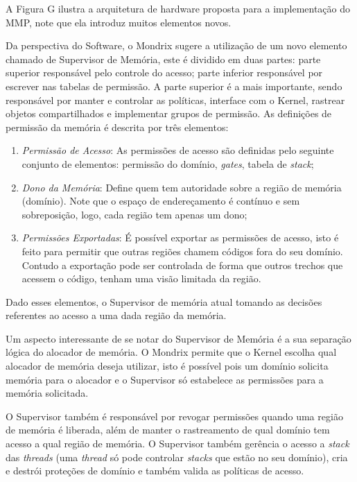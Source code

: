 
A Figura G ilustra a arquitetura de hardware proposta para a implementação do
MMP, note que ela introduz muitos elementos novos. %

Da perspectiva do Software, o Mondrix \citep{mondrix} sugere a utilização de um
novo elemento chamado de Supervisor de Memória, este é dividido em duas partes:
parte superior responsável pelo controle do acesso; parte inferior responsável
por escrever nas tabelas de permissão. A parte superior é a mais importante,
sendo responsável por manter e controlar as políticas, interface com o Kernel,
rastrear objetos compartilhados e implementar grupos de permissão. As
definições de permissão da memória é descrita por três elementos:

\begin{enumerate}
	\item \emph{Permissão de Acesso}: As permissões de acesso são definidas pelo
				seguinte conjunto de elementos: permissão do domínio, \emph{gates},
        tabela de \emph{stack};
	\item \emph{Dono da Memória}: Define quem tem autoridade sobre a região de
				memória (domínio). Note que o espaço de endereçamento é contínuo e sem
				sobreposição, logo, cada região tem apenas um dono;
	\item \emph{Permissões Exportadas}: É possível exportar as permissões de
				acesso, isto é feito para permitir que outras regiões chamem códigos
				fora do seu domínio. Contudo a exportação pode ser controlada de forma
				que outros trechos que acessem o código, tenham uma visão limitada da
				região.
\end{enumerate}

Dado esses elementos, o Supervisor de memória atual tomando as decisões
referentes ao acesso a uma dada região da memória.

Um aspecto interessante de se notar do Supervisor de Memória é a sua separação
lógica do alocador de memória. O Mondrix permite que o Kernel escolha qual
alocador de memória deseja utilizar, isto é possível pois um domínio solicita
memória para o alocador e o Supervisor só estabelece as permissões para a
memória solicitada.

O Supervisor também é responsável por revogar permissões quando uma região de
memória é liberada, além de manter o rastreamento de qual domínio tem acesso a
qual região de memória. O Supervisor também gerência o acesso a \emph{stack}
das \emph{threads} (uma \emph{thread} só pode controlar \emph{stacks} que estão
no seu domínio), cria e destrói proteções de domínio e também valida as
políticas de acesso.

